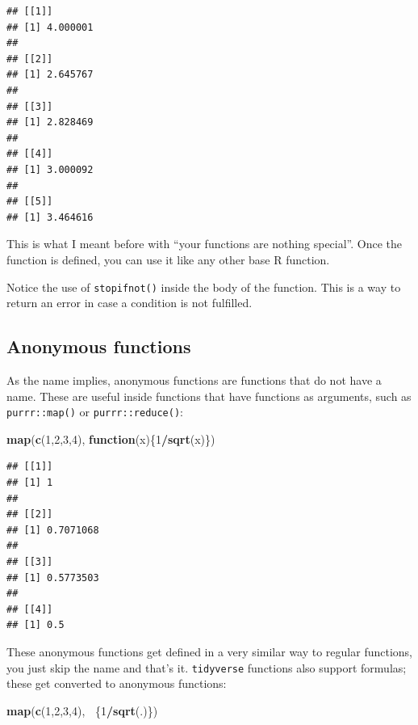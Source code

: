\documentclass[]{gitbook}
\newenvironment{Shaded}{\begin{snugshade}}{\end{snugshade}}
\newcommand{\ControlFlowTok}[1]{\textcolor[rgb]{0.13,0.29,0.53}{\textbf{#1}}}
\newcommand{\DecValTok}[1]{\textcolor[rgb]{0.00,0.00,0.81}{#1}}
\newcommand{\KeywordTok}[1]{\textcolor[rgb]{0.13,0.29,0.53}{\textbf{#1}}}
\newcommand{\NormalTok}[1]{#1}
\newcommand{\OperatorTok}[1]{\textcolor[rgb]{0.81,0.36,0.00}{\textbf{#1}}}
\theoremstyle{definition}
\theoremstyle{definition}
\theoremstyle{definition}
\theoremstyle{remark}
\begin{document}
\begin{verbatim}
## [[1]]
## [1] 4.000001
## 
## [[2]]
## [1] 2.645767
## 
## [[3]]
## [1] 2.828469
## 
## [[4]]
## [1] 3.000092
## 
## [[5]]
## [1] 3.464616
\end{verbatim}

This is what I meant before with ``your functions are nothing special''.
Once the function is defined, you can use it like any other base R
function.

Notice the use of \texttt{stopifnot()} inside the body of the function.
This is a way to return an error in case a condition is not fulfilled.

\hypertarget{anonymous-functions}{%
\subsection{Anonymous functions}\label{anonymous-functions}}

As the name implies, anonymous functions are functions that do not have
a name. These are useful inside functions that have functions as
arguments, such as \texttt{purrr::map()} or \texttt{purrr::reduce()}:

\begin{Shaded}
\begin{Highlighting}[]
\KeywordTok{map}\NormalTok{(}\KeywordTok{c}\NormalTok{(}\DecValTok{1}\NormalTok{,}\DecValTok{2}\NormalTok{,}\DecValTok{3}\NormalTok{,}\DecValTok{4}\NormalTok{), }\ControlFlowTok{function}\NormalTok{(x)\{}\DecValTok{1}\OperatorTok{/}\KeywordTok{sqrt}\NormalTok{(x)\})}
\end{Highlighting}
\end{Shaded}

\begin{verbatim}
## [[1]]
## [1] 1
## 
## [[2]]
## [1] 0.7071068
## 
## [[3]]
## [1] 0.5773503
## 
## [[4]]
## [1] 0.5
\end{verbatim}

These anonymous functions get defined in a very similar way to regular
functions, you just skip the name and that's it. \texttt{tidyverse}
functions also support formulas; these get converted to anonymous
functions:

\begin{Shaded}
\begin{Highlighting}[]
\KeywordTok{map}\NormalTok{(}\KeywordTok{c}\NormalTok{(}\DecValTok{1}\NormalTok{,}\DecValTok{2}\NormalTok{,}\DecValTok{3}\NormalTok{,}\DecValTok{4}\NormalTok{), }\OperatorTok{~}\NormalTok{\{}\DecValTok{1}\OperatorTok{/}\KeywordTok{sqrt}\NormalTok{(.)\})}
\end{Highlighting}
\end{Shaded}
\end{document}
